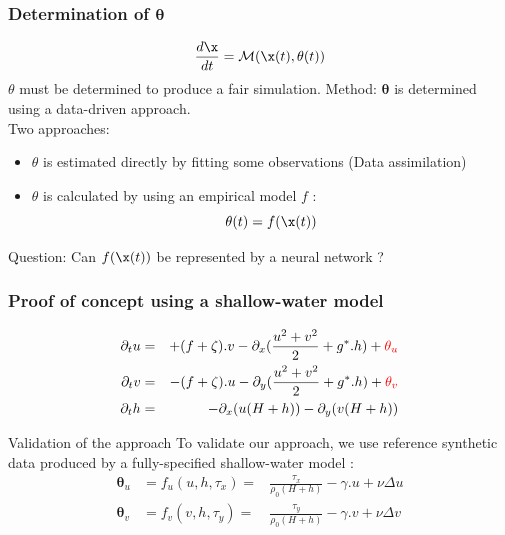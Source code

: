 \documentclass[handout]{beamer}
\newcommand{\btheta}{\mathbf{\theta}}
\newcommand{\M}{\mathcal{M}}
\begin{document}
\begin{frame}
\frametitle{Determination of $\btheta$}
\begin{equation*}
\frac{d\x}{dt} = \M(\x(t),\btheta(t))
\end{equation*}
    $\theta$ must be determined to produce a fair simulation.
\pause[2]
\alert{Method:}    $\btheta$ is determined using a data-driven approach.\\
\vspace{1em}
\pause[3]
Two approaches:
\begin{itemize}
\item <3-> {$\theta$ is estimated directly by fitting some observations (Data assimilation)}
\item <4->\alert<5>{ $\theta$ is calculated by using an empirical model $f$  :
\begin{equation*}
\btheta(t) = f(\x(t))
\end{equation*}}
\end{itemize}
\pause[5]
\begin{alertblock}{Question:}
Can $f(\x(t))$ be represented by a neural network ?
\end{alertblock}
\end{frame}

\begin{frame}
\frametitle{Proof of concept using a shallow-water model}
\vspace{-1.5em}
\begin{eqnarray}
\partial_tu & = &
+ (f + \zeta ).v  - \partial_x (\frac{u^2+v^2}{2} + g^*.h) + \textcolor{red}{\btheta_u}\nonumber \\
\partial_tv & = &
-  (f + \zeta ).u  - \partial_y (\frac{u^2+v^2}{2} + g^*.h) + \textcolor{red}{\btheta_v}\nonumber \\
\partial_th & = &
- \partial_x(u(H+h)) - \partial_y(v(H+h)) \nonumber
\end{eqnarray}

\vspace{.5em}
\pause
\begin{block}{Validation of the approach}
To validate our approach, we use reference synthetic data produced by a
fully-specified shallow-water model :
\begin{eqnarray*}
\btheta_u& =  f_u(u,h,\tau_x)  = & \frac{\tau_x}{\rho_0(H+h)} - \gamma . u + \nu\Delta u\\
\btheta_v &=  f_v(v,h,\tau_y)  = & \frac{\tau_y}{\rho_0(H+h)} - \gamma . v + \nu\Delta v 
\end{eqnarray*}
\end{block}
\end{frame}
\end{document}
